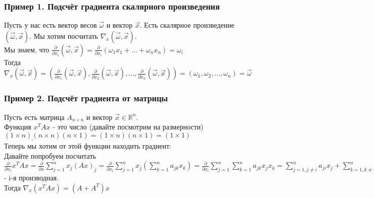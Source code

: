 \documentclass{article}
\theoremstyle{problemstyle}
\theoremstyle{ans}
\begin{document}
\subsubsection{Пример 1. Подсчёт градиента скалярного произведения}
Пусть у нас есть вектор весов $\overrightarrow{\omega}$ и вектор $\overrightarrow{x}$. Есть скалярное произведение $(\overrightarrow{\omega}, \overrightarrow{x})$. Мы хотим посчитать $\nabla_x (\overrightarrow{\omega}, \overrightarrow{x})$.\\
Мы знаем, что $\frac{\partial}{\partial x_i} (\overrightarrow{\omega}, \overrightarrow{x}) = \frac{\partial}{\partial x_i}(\omega_1 x_1 + \dots + \omega_n x_n) = \omega_i$\\
Тогда $\nabla_x (\overrightarrow{\omega}, \overrightarrow{x}) = (\frac{\partial}{\partial x_1}(\overrightarrow{\omega}, \overrightarrow{x}), \frac{\partial}{\partial x_2}(\overrightarrow{\omega}, \overrightarrow{x}), \dots , \frac{\partial}{\partial x_n}(\overrightarrow{\omega}, \overrightarrow{x})) = (\omega_1, \omega_2, \dots, \omega_n) = \overrightarrow{\omega}$

\subsubsection{Пример 2. Подсчёт градиента от матрицы}
Пусть есть матрица $A_{n\times n}$ и вектор $\overrightarrow{x} \in \mathbb{R}^n$.\\
Функция $x^T A x$ - это число (давайте посмотрим на размерности)\\
$\underline{(1\times n) (n \times n)} (n \times 1) = (1 \times n) (n \times 1) = (1 \times 1)$\\
Теперь мы хотим от этой функции находить градиент:\\
Давайте попробуем посчитать $\frac{\partial}{\partial x_i} x^T A x = \frac{\partial}{\partial x} \sum\limits_{j=1}^{n}x_j(Ax)_j = \frac{\partial}{\partial x_i} \sum\limits_{j = 1}^{n} x_j(\sum\limits_{k=1}^{n} a_{jk} x_k) = \frac{\partial}{\partial x_i} \sum\limits_{j = 1}^{n}\sum\limits_{k=1}^{n} a_{jk} x_j x_k = \sum\limits_{j=1, j\neq i}^n a_{ji}x_j + \sum\limits_{k=1, k \neq i}^{n} a_{ik}x_i + 2a_{ii}x_i = \sum\limits_{i=1}^{n} \sum\limits_{j=1}^{n} (a_{ij} + a_{ji})x_j$ - i-я производная.\\

Тогда $\nabla_x (x^T A x) = (A + A^T)x$
\end{document}
